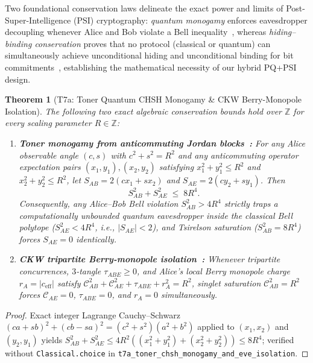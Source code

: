 \documentclass[11pt,reqno]{amsart}
\newtheorem{theorem}{Theorem}[section]
\theoremstyle{definition}
\newcommand{\Z}{\mathbb{Z}}
\newcommand{\Con}{\mathcal{C}}
\newcommand{\code}[1]{\texttt{\small #1}}
\begin{document}
Two foundational conservation laws delineate the exact power and limits of Post-Super-Intelligence (PSI) cryptography: \emph{quantum monogamy} enforces eavesdropper decoupling whenever Alice and Bob violate a Bell inequality~\cite{toner2009,ckw2000}, whereas \emph{hiding--binding conservation} proves that no protocol (classical or quantum) can simultaneously achieve unconditional hiding and unconditional binding for bit commitments~\cite{mayers1997}, establishing the mathematical necessity of our hybrid PQ+PSI design.

\begin{theorem}[T7a: Toner Quantum CHSH Monogamy \& CKW Berry-Monopole Isolation]
\label{thm:t7a}
The following two exact algebraic conservation bounds hold over $\Z$ for every scaling parameter $R \in \Z$:
\begin{enumerate}[leftmargin=1.8em]
  \item \textbf{Toner monogamy from anticommuting Jordan blocks~\cite{toner2009}:} For any Alice observable angle $(c,s)$ with $c^2+s^2=R^2$ and any anticommuting operator expectation pairs $(x_1,y_1), (x_2,y_2)$ satisfying $x_1^2+y_1^2 \le R^2$ and $x_2^2+y_2^2 \le R^2$, let $S_{AB} = 2(c x_1 + s x_2)$ and $S_{AE} = 2(c y_2 + s y_1)$. Then
  \[
    S_{AB}^2 + S_{AE}^2 \;\le\; 8 R^4.
  \]
  Consequently, \emph{any} Alice--Bob Bell violation $S_{AB}^2 > 4 R^4$ strictly traps a computationally unbounded quantum eavesdropper inside the classical Bell polytope ($S_{AE}^2 < 4 R^4$, i.e., $|S_{AE}| < 2$), and Tsirelson saturation ($S_{AB}^2 = 8 R^4$) forces $S_{AE} = 0$ identically.
  \item \textbf{CKW tripartite Berry-monopole isolation~\cite{ckw2000}:} Whenever tripartite concurrences, $3$-tangle $\tau_{ABE} \ge 0$, and Alice's local Berry monopole charge $r_A = |c_{\mathrm{eff}}|$ satisfy $\Con_{AB}^2 + \Con_{AE}^2 + \tau_{ABE} + r_A^2 = R^2$, singlet saturation $\Con_{AB}^2 = R^2$ forces $\Con_{AE} = 0$, $\tau_{ABE} = 0$, and $r_A = 0$ simultaneously.
\end{enumerate}
\end{theorem}
\begin{proof}
Exact integer Lagrange Cauchy--Schwarz $(c a + s b)^2 + (c b - s a)^2 = (c^2+s^2)(a^2+b^2)$ applied to $(x_1,x_2)$ and $(y_2,y_1)$ yields $S_{AB}^2 + S_{AE}^2 \le 4R^2((x_1^2+y_1^2)+(x_2^2+y_2^2)) \le 8R^4$; verified without \code{Classical.choice} in \code{t7a\_toner\_chsh\_monogamy\_and\_eve\_isolation}.
\end{proof}
\end{document}
